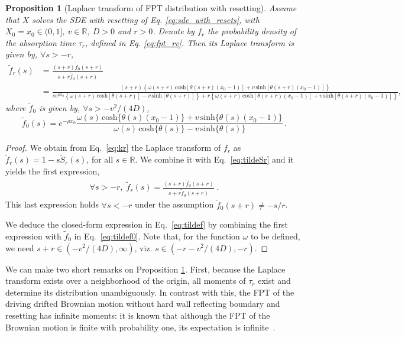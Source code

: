 \documentclass[preprint,12pt]{elsarticle}
\numberwithin{equation}{section}
\theoremstyle{plain} \newtheorem{theorem}{Theorem}[section]
\theoremstyle{plain} \newtheorem{proposition}[theorem]{Proposition}
\theoremstyle{plain} \newtheorem{lemma}[theorem]{Lemma}
\theoremstyle{plain} \newtheorem{corollary}[theorem]{Corollary}
\theoremstyle{definition} \newtheorem{definition}[theorem]{Definition}
\theoremstyle{definition} \newtheorem{notation}[theorem]{Notation}
\theoremstyle{remark} \newtheorem{remark}[theorem]{Remark}
\theoremstyle{remark} \newtheorem{remarks}[theorem]{Remarks}
\theoremstyle{remark} \newtheorem{algorithm2}[theorem]{Algorithm}
\theoremstyle{remark} \newtheorem{example}[theorem]{Example}
\begin{document}
\begin{proposition}[Laplace transform of FPT distribution with resetting] \label{prop:laplaceres}
    Assume that $X$ solves the SDE with resetting of Eq. \eqref{eq:sde_with_resets}, with $X_0 = x_0 \in (0,1]$, $v \in \mathbb R$, $D>0$ and $r>0$. 
    Denote by $f_r$ the probability density of the absorption time $\tau_r$, defined in Eq. \eqref{eq:fpt_rv}. Then its Laplace transform is given by, $\forall s >-r$,
    \begin{align} \label{eq:tildef}
\tilde{f}_r(s) &
    = \frac{(s+r)\tilde{f}_0(s+r)}{s+r\tilde{f}_0(s+r)} \nonumber \\
    & 
    {\textstyle
    =\frac{(s+r) \left\{ \omega(s+r) \, \mathrm{cosh}[\theta(s+r)(x_0-1)]+v \, \mathrm{sinh}[\theta(s+r)(x_0-1)]\right\}}
    {s e^{\rho x_0}\left\{ \omega(s+r) \, \mathrm{cosh}[\theta(s+r)]-v \, \mathrm{sinh}[\theta(s+r)] \right\}
    + r \left\{ \omega(s+r) \, \mathrm{cosh}[\theta(s+r)(x_0-1)]+v \, \mathrm{sinh}[\theta(s+r)(x_0-1)] \right\} }},
\end{align}
where $\tilde{f}_0$ is given by, $\forall s> -v^2/(4D)$,
\begin{equation} \label{eq:tildef0}
	\tilde{f}_0(s)=
	e^{-\rho x_0}\frac{\omega(s) \, \mathrm{cosh}\{\theta(s)(x_0-1)\}+v \, \mathrm{sinh}\{\theta(s)(x_0-1)\}}
	{\omega(s) \, \mathrm{cosh}\{\theta(s)\}-v \, \mathrm{sinh}\{\theta(s)\}}\,.
\end{equation}
\end{proposition}
\begin{proof}
    We obtain from Eq.~\eqref{eq:kr} the Laplace transform of $f_r$ as
$\tilde{f}_r(s)=1-s\tilde{S}_r(s)$, for all $s \in \mathbb{R}$.
We combine it with Eq.~\eqref{eq:tildeSr} and it yields the first 
expression,
\begin{align*}
\forall s > -r, 	\; \tilde{f}_r(s)=\frac{(s+r)\tilde{f}_0(s+r)}{s+r\tilde{f}_0(s+r)}
 \; .
 \end{align*}
 This last expression holds $\forall s < -r$ under the assumption $ \tilde{f}_0(s+r)\neq -s/r$.  

We deduce the closed-form expression 
 in Eq.~\eqref{eq:tildef}
 by combining the first expression with $\tilde f_0$ in Eq.~\eqref{eq:tildef0}. Note that, for the function $\omega$ to be defined, we need $s+r \in \left(-v^2/(4D),\infty \right)$, viz. $s \in \left(- r -v^2/(4D), -r \right)$. 
\end{proof}

We can make two short remarks on Proposition
\ref{prop:laplaceres}. First, because the Laplace
transform exists over a neighborhood of the 
origin, all moments of $\tau_r$ exist and
determine its distribution unambiguously.
In contrast with this, the FPT of the driving drifted Brownian motion without hard wall reflecting boundary and resetting
has infinite moments:
it is known that although the FPT of the Brownian
motion is finite with probability one, its 
expectation is infinite~\cite{redner2001guide}.
\end{document}
